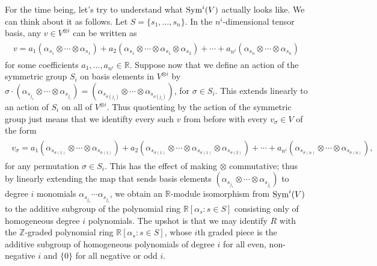 \noindent For the time being, let's try to understand what $\textnormal{Sym}^i(V)$ actually looks like. We can think about it as follows. Let $S = \{s_1, \dots, s_n\}$. In the $n^i$-dimensional tensor basis, any $v \in V^{\otimes i}$ can be written as
\begin{align*}
\begin{split}
v = a_1(\alpha_{s_1} \otimes \cdots \otimes \alpha_{s_1}) + a_2(\alpha_{s_1} \otimes \cdots \otimes \alpha_{s_1} \otimes \alpha_{s_2}) + \cdots + a_{n^i}(\alpha_{s_n} \otimes \cdots \otimes \alpha_{s_n})
\end{split}
\end{align*}
\noindent for some coefficients $a_1, \dots, a_{n^i} \in \mathbb{R}$. Suppose now that we define an action of the symmetric group $S_i$ on basis elements in $V^{\otimes i}$ by $\sigma \cdot (\alpha_{s_{j_1}} \otimes \cdots \otimes \alpha_{s_{j_i}}) = (\alpha_{s_{\sigma(j_1)}} \otimes \cdots \otimes \alpha_{s_{\sigma(j_i)}})$, for $\sigma \in S_i$. This extends linearly to an action of $S_i$ on all of $V^{\otimes i}$. Thus quotienting by the action of the symmetric group just means that we identifty every such $v$ from before with every $v_\sigma \in V$ of the form
\begin{align*}
\begin{split}
v_\sigma = a_1(\alpha_{s_{\sigma(1)}} \otimes \cdots \otimes \alpha_{s_{\sigma(1)}}) + a_2(\alpha_{s_{\sigma(1)}} \otimes \cdots \otimes \alpha_{s_{\sigma(1)}} \otimes \alpha_{s_{\sigma(2)}}) + \cdots + a_{n^i}(\alpha_{s_{\sigma(n)}} \otimes \cdots \otimes \alpha_{s_{\sigma(n)}}),
\end{split}
\end{align*}
for any permutation $\sigma \in S_i$. This has the effect of making $\otimes$ commutative; thus by linearly extending the map that sends basis elements $(\alpha_{s_{j_1}} \otimes \cdots \otimes \alpha_{s_{j_i}})$ to degree $i$ monomials $\alpha_{s_{j_1}} \cdots \alpha_{s_{j_i}}$, we obtain an $\mathbb{R}$-module isomorphism from $\textnormal{Sym}^i(V)$ to the additive subgroup of the polynomial ring $\mathbb{R}[\alpha_s : s \in S]$ consisting only of homogeneous degree $i$ polynomials. The upshot is that we may identify $R$ with the $\mathbb{Z}$-graded polynomial ring $\mathbb{R}[\alpha_s : s \in S]$, whose $i$th graded piece is the additive subgroup of homogeneous polynomials of degree $i$ for all even, non-negative $i$ and $\{0\}$ for all negative or odd $i$.\newpage%

